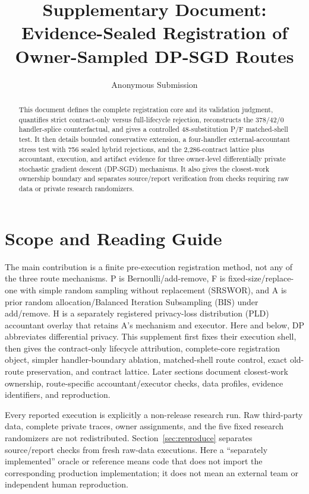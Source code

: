 \documentclass[letterpaper]{article}
\title{Supplementary Document:\\
Evidence-Sealed Registration of Owner-Sampled DP-SGD Routes}
\author{
Anonymous Submission
}
\begin{document}
\maketitle

\begin{abstract}
This document defines the complete registration core and its validation
judgment, quantifies strict contract-only versus full-lifecycle rejection,
reconstructs the 378/42/0 handler-splice counterfactual, and gives a controlled
48-substitution P/F matched-shell test.  It then details bounded conservative
extension, a four-handler external-accountant stress test with 756 sealed
hybrid rejections, and the 2,286-contract lattice plus accountant, execution,
and artifact evidence for three owner-level differentially private stochastic
gradient descent (DP-SGD) mechanisms.  It also gives the
closest-work ownership boundary and separates source/report verification from
checks requiring raw data or private research randomizers.
\end{abstract}

\section{Scope and Reading Guide}

The main contribution is a finite pre-execution registration method, not any
of the three route mechanisms.  P is Bernoulli/add-remove, F is
fixed-size/replace-one with simple random sampling without replacement
(SRSWOR), and A is prior random allocation/Balanced Iteration Subsampling
(BIS) under add/remove.  H is a separately registered privacy-loss distribution
(PLD) accountant overlay that retains A's mechanism and executor.
Here and below, DP abbreviates differential privacy.
This supplement first fixes their execution shell, then gives the
contract-only lifecycle attribution, complete-core registration object,
simpler handler-boundary ablation, matched-shell route control, exact old-route
preservation, and contract lattice.  Later sections document closest-work
ownership, route-specific accountant/executor checks, data profiles, evidence
identifiers, and reproduction.

Every reported execution is explicitly a non-release research run.  Raw
third-party data, complete private traces, owner assignments, and the five
fixed research randomizers are not redistributed.  Section~\ref{sec:reproduce}
separates source/report checks from fresh raw-data executions.
Here a ``separately implemented'' oracle or reference means code that does not
import the corresponding production implementation; it does not mean an
external team or independent human reproduction.
\end{document}
